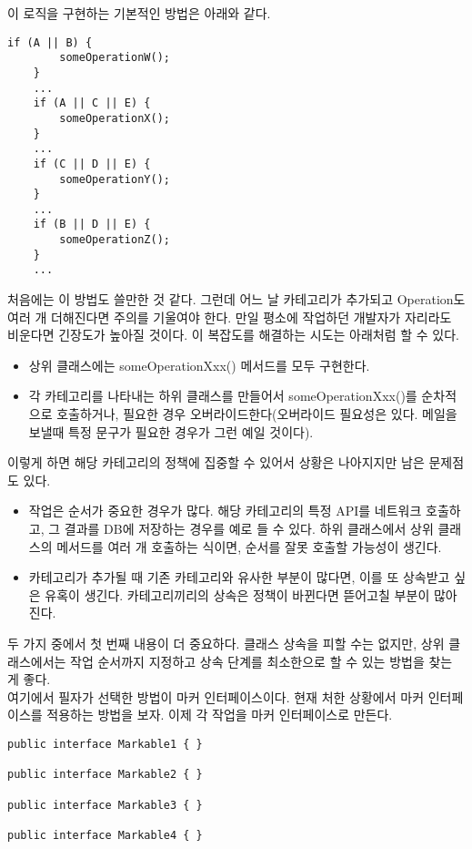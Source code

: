 이 로직을 구현하는 기본적인 방법은 아래와 같다.
\begin{lstlisting}[frame=single]
	if (A || B) { 
		someOperationW(); 
	}
	...
	if (A || C || E) { 
		someOperationX(); 
	}
	...
	if (C || D || E) { 
		someOperationY(); 
	} 
	...
	if (B || D || E) { 
		someOperationZ(); 
	}
	...
\end{lstlisting}
처음에는 이 방법도 쓸만한 것 같다.
그런데 어느 날 카테고리가 추가되고 Operation도 여러 개 더해진다면 주의를 기울여야 한다.
만일 평소에 작업하던 개발자가 자리라도 비운다면 긴장도가 높아질 것이다. 
이 복잡도를 해결하는 시도는 아래처럼 할 수 있다.
\begin{itemize}
\item 상위 클래스에는 someOperationXxx() 메서드를 모두 구현한다.
\item 각 카테고리를 나타내는 하위 클래스를 만들어서 someOperationXxx()를 순차적으로 호출하거나, 필요한 경우 오버라이드한다(오버라이드 필요성은 있다. 메일을 보낼때 특정 문구가 필요한 경우가 그런 예일 것이다).
\end{itemize}

이렇게 하면 해당 카테고리의 정책에 집중할 수 있어서 상황은 나아지지만 남은 문제점도 있다.
\begin{itemize}
\item 작업은 순서가 중요한 경우가 많다. 해당 카테고리의 특정 API를 네트워크 호출하고, 그 결과를 DB에 저장하는 경우를 예로 들 수 있다.
하위 클래스에서 상위 클래스의 메서드를 여러 개 호출하는 식이면, 순서를 잘못 호출할 가능성이 생긴다.
\item 카테고리가 추가될 때 기존 카테고리와 유사한 부분이 많다면, 이를 또 상속받고 싶은 유혹이 생긴다.
카테고리끼리의 상속은 정책이 바뀐다면 뜯어고칠 부분이 많아진다.
\end{itemize}

두 가지 중에서 첫 번째 내용이 더 중요하다. 
클래스 상속을 피할 수는 없지만, 상위 클래스에서는 작업 순서까지 지정하고 상속 단계를 최소한으로 할 수 있는 방법을 찾는 게 좋다.\\

여기에서 필자가 선택한 방법이 마커 인터페이스이다. 
현재 처한 상황에서 마커 인터페이스를 적용하는 방법을 보자.
이제 각 작업을 마커 인터페이스로 만든다.\\

\begin{lstlisting}[frame=single]
public interface Markable1 { }

public interface Markable2 { }

public interface Markable3 { }

public interface Markable4 { }
\end{lstlisting}

